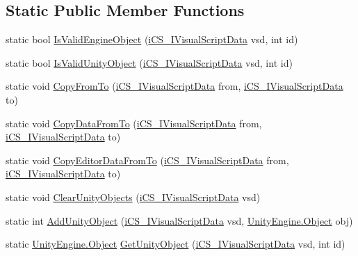 \subsection*{Static Public Member Functions}
\begin{DoxyCompactItemize}
\item 
static bool \hyperlink{classi_c_s___visual_script_data_a34e393a79450ca1ee9303aad08fb83b3}{Is\+Valid\+Engine\+Object} (\hyperlink{interfacei_c_s___i_visual_script_data}{i\+C\+S\+\_\+\+I\+Visual\+Script\+Data} vsd, int id)
\item 
static bool \hyperlink{classi_c_s___visual_script_data_a0966ee3d9f19d2d41e0c3ee71e964bad}{Is\+Valid\+Unity\+Object} (\hyperlink{interfacei_c_s___i_visual_script_data}{i\+C\+S\+\_\+\+I\+Visual\+Script\+Data} vsd, int id)
\item 
static void \hyperlink{classi_c_s___visual_script_data_a64a38d8fc010909a43a783bd5395a7bf}{Copy\+From\+To} (\hyperlink{interfacei_c_s___i_visual_script_data}{i\+C\+S\+\_\+\+I\+Visual\+Script\+Data} from, \hyperlink{interfacei_c_s___i_visual_script_data}{i\+C\+S\+\_\+\+I\+Visual\+Script\+Data} to)
\item 
static void \hyperlink{classi_c_s___visual_script_data_a18e32dcfcc7f8c285ab7f161a61b32c5}{Copy\+Data\+From\+To} (\hyperlink{interfacei_c_s___i_visual_script_data}{i\+C\+S\+\_\+\+I\+Visual\+Script\+Data} from, \hyperlink{interfacei_c_s___i_visual_script_data}{i\+C\+S\+\_\+\+I\+Visual\+Script\+Data} to)
\item 
static void \hyperlink{classi_c_s___visual_script_data_a4545e6b62b9499400010226bc2139c9d}{Copy\+Editor\+Data\+From\+To} (\hyperlink{interfacei_c_s___i_visual_script_data}{i\+C\+S\+\_\+\+I\+Visual\+Script\+Data} from, \hyperlink{interfacei_c_s___i_visual_script_data}{i\+C\+S\+\_\+\+I\+Visual\+Script\+Data} to)
\item 
static void \hyperlink{classi_c_s___visual_script_data_ac87f59e34c74664b75623729b377e250}{Clear\+Unity\+Objects} (\hyperlink{interfacei_c_s___i_visual_script_data}{i\+C\+S\+\_\+\+I\+Visual\+Script\+Data} vsd)
\item 
static int \hyperlink{classi_c_s___visual_script_data_aa2a1b6c3ee24919fc210aca2ea146a7f}{Add\+Unity\+Object} (\hyperlink{interfacei_c_s___i_visual_script_data}{i\+C\+S\+\_\+\+I\+Visual\+Script\+Data} vsd, \hyperlink{i_c_s___logic_8cs_a5b2c8b05b9a357906d7f9e5b2c1e154d}{Unity\+Engine.\+Object} obj)
\item 
static \hyperlink{i_c_s___logic_8cs_a5b2c8b05b9a357906d7f9e5b2c1e154d}{Unity\+Engine.\+Object} \hyperlink{classi_c_s___visual_script_data_aa7c8dc0fc8736d0ddab979e0572c502d}{Get\+Unity\+Object} (\hyperlink{interfacei_c_s___i_visual_script_data}{i\+C\+S\+\_\+\+I\+Visual\+Script\+Data} vsd, int id)

\end{DoxyCompactItemize}
